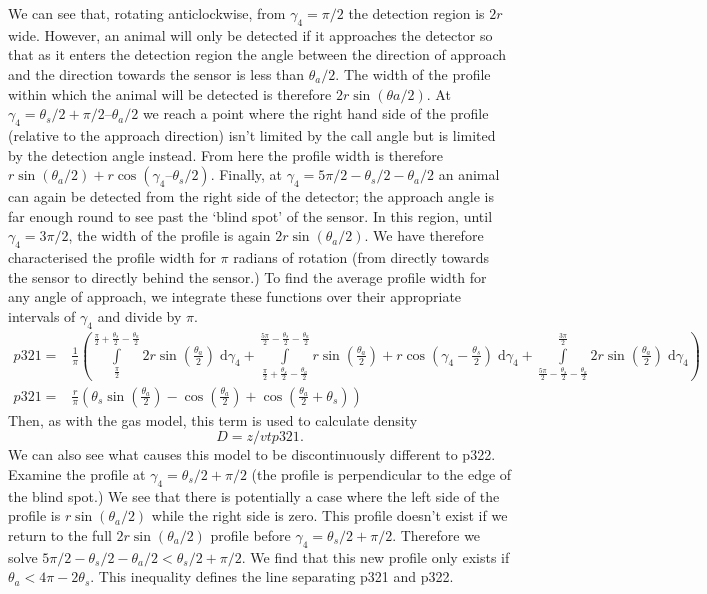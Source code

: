 \documentclass[a4paper,10pt,reqno,oneside]{amsart}
\begin{document}
We can see that, rotating anticlockwise, from $\gamma_4  = \pi/2$ the detection region is $2r$ wide. However, an animal will only be detected if it approaches the detector so that as it enters the detection region the angle between the direction of approach and the direction towards the sensor is less than $\theta_a/2$. The width of the profile within which the animal will be detected is therefore $2r\sin(θa/2)$. At $\gamma_4  = \theta_s/2 + \pi/2 – \theta_a/2$ we reach a point where the right hand side of the profile (relative to the approach direction) isn't limited by the call angle but is limited by the detection angle instead. From here the profile width is therefore $r\sin( \theta_a/2) + r\cos( \gamma_4  – \theta_s/2)$. Finally, at $\gamma_4  = 5\pi/2 - \theta_s/2  - \theta_a/2$ an animal can again be detected from the right side of the detector; the approach angle is far enough round to see past the `blind spot' of the sensor. In this region, until $\gamma_4  = 3\pi/2$, the width of the profile is again $2r\sin( \theta_a/2)$. We have therefore characterised the profile width for $\pi$ radians of rotation (from directly towards the sensor to directly behind the sensor.) To find the average profile width for any angle of approach, we integrate these functions over their appropriate intervals of $\gamma_4 $ and divide by $\pi$.
\begin{align}
    p321 =&\frac{1}{\pi} \left(\int\limits_{\frac{\pi}{2}}^{\frac{\pi}{2} + \frac{\theta_{s}}{2} - \frac{\theta_{a}}{2}}2 r \sin{\left (\frac{\theta_{a}}{2} \right )}\;\mathrm{d}\gamma_{4}+\int\limits_{\frac{\pi}{2} + \frac{\theta_{s}}{2} - \frac{\theta_{a}}{2}}^{\frac{5 \pi}{2} - \frac{\theta_{s}}{2} - \frac{\theta_{a}}{2}}r \sin{\left (\frac{\theta_{a}}{2} \right )} + r \cos{\left (\gamma_{4} - \frac{\theta_{s}}{2} \right )}\;\mathrm{d}\gamma_{4}+\int\limits_{\frac{5 \pi}{2} - \frac{\theta_{s}}{2} - \frac{\theta_{a}}{2}}^{\frac{3 \pi}{2}}2 r \sin{\left (\frac{\theta_{a}}{2} \right )}\;\mathrm{d}\gamma_{4}\right)\\
    p321 =& \frac{r}{\pi} \left(\theta_{s} \sin{\left (\frac{\theta_{a}}{2} \right )} - \cos{\left (\frac{\theta_{a}}{2} \right )} + \cos{\left (\frac{\theta_{a}}{2} + \theta_{s} \right )}\right)
\end{align}
Then, as with the gas model, this term is used to calculate density
\begin{equation}
D = z/vtp321. 
\end{equation}
We can also see what causes this model to be discontinuously different to p322. Examine the profile at $\gamma_4 = \theta_s/2 + \pi/2$ (the profile is perpendicular to the edge of the blind spot.) We see that there is potentially a case where the left side of the profile is $r\sin( \theta_a/2)$ while the right side is zero. This profile doesn't exist if we return to the full $2r\sin( \theta_a/2)$ profile before $\gamma_4  = \theta_s/2 + \pi/2$. Therefore we solve $5\pi/2 - \theta_s/2 - \theta_a/2 <  \theta_s/2 + \pi/2$. We find that this new profile only exists if $ \theta_a < 4\pi - 2 \theta_s$. This inequality defines the line separating p321 and p322.
\end{document}

